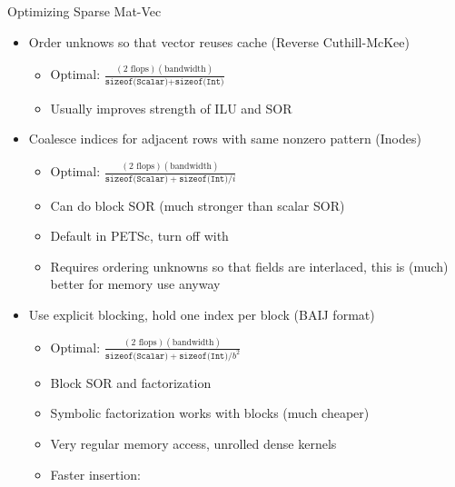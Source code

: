 \begin{frame}{Optimizing Sparse Mat-Vec}
  \begin{itemize}
  \item Order unknows so that vector reuses cache (Reverse Cuthill-McKee)
    \begin{itemize}
    \item Optimal: $\frac{(2 \text{ flops})(\text{bandwidth})}{\texttt{sizeof(Scalar)} + \texttt{sizeof(Int)}}$
    \item Usually improves strength of ILU and SOR
    \end{itemize}
  \item Coalesce indices for adjacent rows with same nonzero pattern (Inodes)
    \begin{itemize}
    \item Optimal: $\frac{(2 \text{ flops})(\text{bandwidth})}{\texttt{sizeof(Scalar)} + \texttt{sizeof(Int)}/i}$
    \item Can do block SOR (much stronger than scalar SOR)
    \item Default in PETSc, turn off with 
    \item Requires ordering unknowns so that fields are interlaced, this
      is (much) better for memory use anyway
    \end{itemize}
  \item Use explicit blocking, hold one index per block (BAIJ format)
    \begin{itemize}
    \item Optimal: $\frac{(2 \text{ flops})(\text{bandwidth})}{\texttt{sizeof(Scalar)} + \texttt{sizeof(Int)}/b^2}$
    \item Block SOR and factorization
    \item Symbolic factorization works with blocks (much cheaper)
    \item Very regular memory access, unrolled dense kernels
    \item Faster insertion: 
    \end{itemize}
  \end{itemize}
\end{frame}
